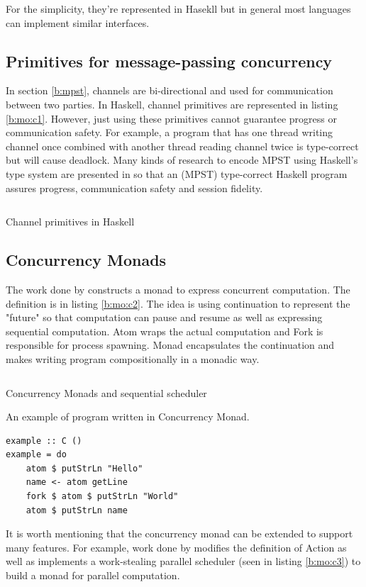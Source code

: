For the simplicity, they're represented in Hasekll but in general most languages can implement similar interfaces. 
\subsection{Primitives for message-passing concurrency}
In section \ref{b:mpst}, channels are bi-directional and used for communication between two parties. In Haskell, channel primitives are represented in listing \ref{b:mo:c1}. However, just using these primitives cannot guarantee progress or communication safety. For example, a program that has one thread writing channel once combined with another thread reading channel twice is type-correct but will cause deadlock. Many kinds of research to encode MPST using Haskell's type system are presented in \cite{orchardSessionTypesLinearity} so that an (MPST) type-correct Haskell program assures progress, communication safety and session fidelity.
\begin{listing}[ht]
  \inputminted{haskell}{background/mo-chan.hs}
  \caption{Channel primitives in Haskell}
  \label{b:mo:c1}
\end{listing}
\subsection{Concurrency Monads}
The work done by \cite{claessenFunctionalPearlsPoor1999} constructs a monad to express concurrent computation. The definition is in listing \ref{b:mo:c2}. The idea is using continuation to represent the "future" so that computation can pause and resume as well as expressing sequential computation. Atom wraps the actual computation and Fork is responsible for process spawning. Monad encapsulates the continuation and makes writing program compositionally in a monadic way.

\begin{listing}[ht]
  \inputminted{haskell}{background/mo-cm.hs}
  \caption{Concurrency Monads and sequential scheduler}
  \label{b:mo:c2}
\end{listing}

An example of program written in Concurrency Monad.
\begin{verbatim}
example :: C ()
example = do
    atom $ putStrLn "Hello"
    name <- atom getLine
    fork $ atom $ putStrLn "World"
    atom $ putStrLn name
\end{verbatim}

It is worth mentioning that the concurrency monad can be extended to support many features. For example, work done by \cite{marlowMonadDeterministicParallelism} modifies the definition of Action as well as implements a work-stealing parallel scheduler (seen in listing \ref{b:mo:c3}) to build a monad for parallel computation. 

